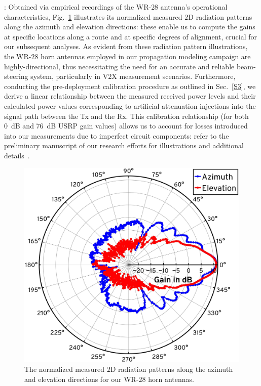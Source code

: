 \documentclass[12pt, draftcls, onecolumn]{IEEEtran}
\begin{document}
{: Obtained via empirical recordings of the WR-$28$ antenna's operational characteristics, Fig.~\ref{F4} illustrates its normalized measured $2$D radiation patterns along the azimuth and elevation directions: these enable us to compute the gains at specific locations along a route and at specific degrees of alignment, crucial for our subsequent analyses. As evident from these radiation pattern illustrations, the WR-$28$ horn antennas employed in our propagation modeling campaign are highly-directional, thus necessitating the need for an accurate and reliable beam-steering system, particularly in V$2$X measurement scenarios. Furthermore, conducting the pre-deployment calibration procedure as outlined in Sec.~\ref{S3}, we derive a linear relationship between the measured received power levels and their calculated power values corresponding to artificial attenuation injections into the signal path between the Tx and the Rx. This calibration relationship (for both \SI{0}{\deci\bel} and \SI{76}{\deci\bel} USRP gain values) allows us to account for losses introduced into our measurements due to imperfect circuit components: refer to the preliminary manuscript of our research efforts for illustrations and additional details~\cite{SPAVE_ICC}.
\begin{figure} [t]
    \centering
    \includegraphics[width=0.55\linewidth]{figs/antenna_patterns.pdf}
    \vspace{-2mm}
    \caption{The normalized measured $2$D radiation patterns along the azimuth and elevation directions for our WR-$28$ horn antennas.}
    \label{F4}
\end{figure}

}
\end{document}
